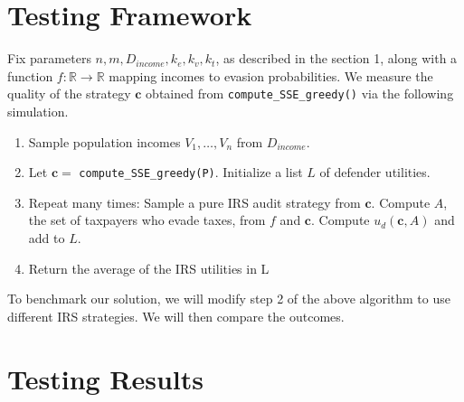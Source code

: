 \documentclass[paper=letter, fontsize=11pt]{article}
\begin{document}
\section*{Testing Framework}
Fix parameters $n, m, D_{income}, k_e, k_v, k_t$, as described in the section 1, along with a function $f : \mathbb{R} \to \mathbb{R}$  mapping incomes to evasion probabilities. We measure the quality of the strategy $\bm{c}$ obtained from \verb|compute_SSE_greedy()| via the following simulation. 

\begin{enumerate}
\item Sample population incomes $V_1, \ldots, V_n$ from $D_{income}$.
\item Let $\bm{c} =$ \verb|compute_SSE_greedy(P)|. Initialize a list $L$ of defender utilities.
\item Repeat many times:
\subitem Sample a pure IRS audit strategy from $\bm{c}$.
\subitem Compute $A$, the set of taxpayers who evade taxes, from $f$ and $\bm{c}$.
\subitem Compute $u_d(\bm{c},A)$ and add to $L$.
\item Return the average of the IRS utilities in L
\end{enumerate}

To benchmark our solution, we will modify step 2 of the above algorithm to use different IRS strategies. We will then compare the outcomes.
\section*{Testing Results}



\end{document}
